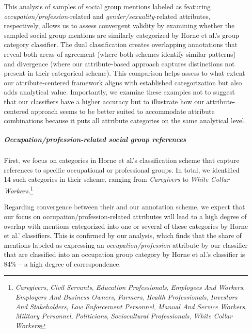 \documentclass[12pt]{article}
\begin{document}
This analysis of samples of social group mentions labeled as featuring \emph{occupation/profession}-related and \emph{gender/sexuality}-related attributes, respectively, allows us to assess convergent validity by examining whether the sampled social group mentions are similarly categorized by Horne et al.'s group category classifier.
The dual classification creates overlapping annotations that reveal both areas of agreement (where both schemes identify similar patterns) and divergence (where our attribute-based approach captures distinctions not present in their categorical scheme).
This comparison helps assess to what extent our attribute-centered framework aligns with established categorization but also adds analytical value.
Importantly, we examine these examples not to suggest that our classifiers have a higher accuracy but to illustrate how our attribute-centered approach seems to be better suited to accommodate attribute combinations because it puts all attribute categories on the same analytical level.

\subparagraph{\texorpdfstring{\emph{Occupation/profession}-related social group references}{Occupation/profession-related social group references}}\label{occupationprofession-related-social-group-references}

First, we focus on categories in Horne et al.'s classification scheme that capture references to specific occupational or professional groups.
In total, we identified 14 such categories in their scheme, ranging from \emph{Caregivers} to \emph{White Collar Workers}.\footnote{\emph{Caregivers}, \emph{Civil Servants}, \emph{Education Professionals}, \emph{Employees And Workers}, \emph{Employers And Business Owners}, \emph{Farmers}, \emph{Health Professionals}, \emph{Investors And Stakeholders}, \emph{Law Enforcement Personnel}, \emph{Manual And Service Workers}, \emph{Military Personnel}, \emph{Politicians}, \emph{Sociocultural Professionals}, \emph{White Collar Workers}}

Regarding convergence between their and our annotation scheme, we expect that our focus on occupation/profession-related attributes will lead to a high degree of overlap with mentions categorized into one or several of these categories by Horne et al.' classifiers.
This is confirmed by our analysis, which finds that the share of mentions labeled as expressing an \emph{occupation/profession} attribute by our classifier that are classified into an occupation group category by Horne et al.'s classifier is 84\% -- a high degree of correspondence.
\end{document}
